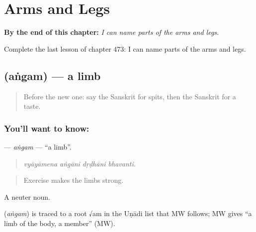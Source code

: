 
\chapter{Arms and Legs}
\label{ch:sa-arms-and-legs}

\begin{chapteropening}
\textbf{By the end of this chapter:} \emph{I can name parts of the arms and legs.}

Complete the last lesson of chapter 473: I can name parts of the arms and legs.
\end{chapteropening}

\section[\texorpdfstring{\sk{अंगम्} (aṅgam)}{अंगम् (aṅgam)}]{ (aṅgam) — a limb}

\label{lesson:SA-C473-angam}



\begin{quote}
Before the new one: say the Sanskrit for spits, then the Sanskrit for a taste.
\end{quote}

\subsection*{You'll want to know: }
\textbf{} — \emph{aṅgam} — \textquotedblleft{}a limb\textquotedblright{}.

\begin{quote}
   
\end{quote}

\begin{quote}
\emph{vyāyāmena aṅgāni dṛḍhāni bhavanti.}
\end{quote}

\begin{quote}
Exercise makes the limbs strong.
\end{quote}

A neuter noun.

\begin{cousinweb}
\textbf{} (\emph{aṅgam}) is traced to a root √am in the Uṇādi list that MW follows; MW gives \textquotedblleft{}a limb of the body, a member\textquotedblright{} (MW).
\end{cousinweb}

